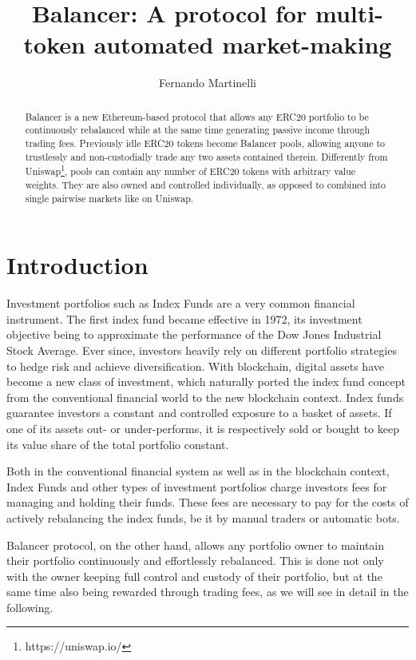 \documentclass[11pt]{amsart}
\title{Balancer: A protocol for multi-token automated market-making}
\author{Fernando Martinelli}
\begin{document}
\maketitle

\begin{abstract}
   Balancer is a new Ethereum-based protocol that allows any ERC20 portfolio to be continuously rebalanced while at the same time generating passive income through trading fees. Previously idle ERC20 tokens become Balancer pools, allowing anyone to trustlessly and non-custodially trade any two assets contained therein. Differently from Uniswap\footnote{https://uniswap.io/}, pools can contain any number of ERC20 tokens with arbitrary value weights. They are also owned and controlled individually, as opposed to combined into single pairwise markets like on Uniswap.
\end{abstract}

\section{Introduction}

Investment portfolios such as Index Funds are a very common financial instrument. The first index fund became effective in 1972, its investment objective being to approximate the performance of the Dow Jones Industrial Stock Average. Ever since, investors heavily rely on different portfolio strategies to hedge risk and achieve diversification. With blockchain, digital assets have become a new class of investment, which naturally ported the index fund concept from the conventional financial world to the new blockchain context. Index funds guarantee investors a constant and controlled exposure to a basket of assets. If one of its assets out- or under-performs, it is respectively sold or bought to keep its value share of the total portfolio constant.

Both in the conventional financial system as well as in the blockchain context, Index Funds and other types of investment portfolios charge investors fees for managing and holding their funds. These fees are necessary to pay for the costs of actively rebalancing the index funds, be it by manual traders or automatic bots. 

Balancer protocol, on the other hand, allows any portfolio owner to maintain their portfolio continuously and effortlessly rebalanced. This is done not only with the owner keeping full control and custody of their portfolio, but at the same time also being rewarded through trading fees, as we will see in detail in the following. 
\end{document}
